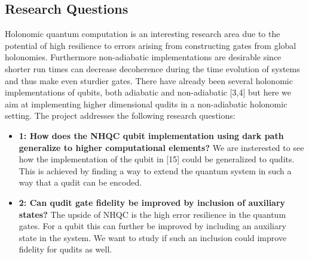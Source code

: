 \subsection{Research Questions}

Holonomic quantum computation is an interesting research area due to the potential of high resilience to errors arising from constructing gates from global holonomies. Furthermore non-adiabatic implementations are desirable since shorter run times can decrease decoherence during the time evolution of systems and thus make even sturdier gates. There have already been several holonomic implementations of qubits, both adiabatic and non-adiabatic [3,4] but here we aim at implementing higher dimensional qudits in a non-adiabatic holonomic setting. The project addresses the following research questions:
\begin{itemize}
\item \textbf{1: How does the NHQC qubit implementation using dark path generalize to higher computational elements?} We are insterested to see how the implementation of the qubit in [15] could be generalized to qudits. This is achieved by finding a way to extend the quantum system in such a way that a qudit can be encoded. 

\item \textbf{2: Can qudit gate fidelity be improved by inclusion of auxiliary states?} The upside of NHQC is the high error resilience in the quantum gates. For a qubit this can further be improved by including an auxiliary state in the system. We want to study if such an inclusion could improve fidelity for qudits as well.


\end{itemize}






